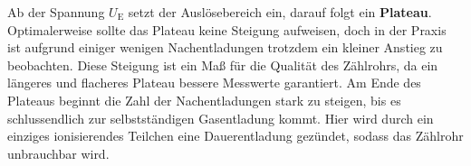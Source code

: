 Ab der Spannung $U_\text{E}$ setzt der Auslösebereich ein, darauf folgt ein \textbf{Plateau}.
Optimalerweise sollte das Plateau keine Steigung aufweisen, doch in der Praxis ist aufgrund
einiger wenigen Nachentladungen trotzdem ein kleiner Anstieg zu beobachten.
Diese Steigung ist ein Maß für die Qualität des Zählrohrs, da ein längeres und flacheres
Plateau bessere Messwerte garantiert.
Am Ende des Plateaus beginnt die Zahl der Nachentladungen stark zu steigen, bis es schlussendlich
zur selbstständigen Gasentladung kommt.
Hier wird durch ein einziges ionisierendes Teilchen eine Dauerentladung gezündet, sodass das
Zählrohr unbrauchbar wird.